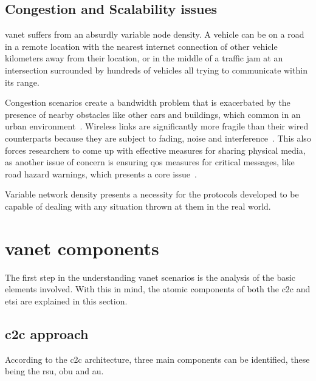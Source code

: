 \subsection{Congestion and Scalability issues}
\label{subsec:congestion_scalability}

\gls{vanet} suffers from an absurdly variable node density. A vehicle can be on a road in a remote location with the nearest internet connection of other vehicle kilometers away from their location, or in the middle of a traffic jam at an intersection surrounded by hundreds of vehicles all trying to communicate within its range.

Congestion scenarios create a bandwidth problem that is exacerbated by the presence of nearby obstacles like other cars and buildings, which common in an urban environment~\cite{toor_vehicle_2008}. Wireless links are significantly more fragile than their wired counterparts because they are subject to fading, noise and interference~\cite{corson_mobile_1999}. This also forces researchers to come up with effective measures for sharing physical media, as another issue of concern is ensuring \gls{qos} measures for critical messages, like road hazard warnings, which presents a core issue~\cite{toor_vehicle_2008}.
 
Variable network density presents a necessity for the protocols developed to be capable of dealing with any situation thrown at them in the real world.


\section[VANET components]{\gls{vanet} components}
\label{sec:VANET_components}

The first step in the understanding \gls{vanet} scenarios is the analysis of the basic elements involved. With this in mind, the atomic components of both the \gls{c2c} and \gls{etsi} are explained in this section.

\subsection[C2C approach]{\gls{c2c} approach}
According to the \gls{c2c} architecture, three main components can be identified, these being the \gls{rsu}, \gls{obu} and \gls{au}.

